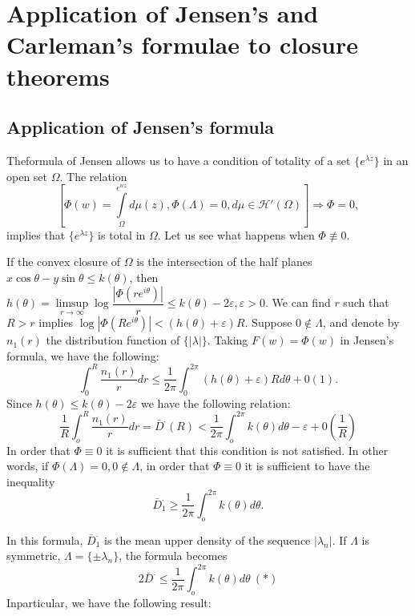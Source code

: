 \chapter[Application of Jensen's and Carleman's formulae...]{Application of Jensen's and Carleman's formulae
 to closure theorems}\label{chap11}%

\section{ Application of Jensen's formula}\label{chap11:sec1}%

The\pageoriginale formula of Jensen allows us to have a condition of totality of a
set $\{ e^{\lambda z} \}$ in an open set $\Omega$. The relation 
$$
[\Phi (w) = \int\limits^{e^{wz}}_{\Omega} d \mu (z), \Phi (\Lambda) = 0, d
 \mu \in \mathscr{H}' (\Omega)] \Rightarrow \Phi = 0, 
$$
implies that $\{ e^{\lambda z} \}$ is total in $\Omega$. Let us see
what happens when $\Phi \nequiv 0$. 

If the convex closure of $\Omega$ is the intersection of the half
planes $x \cos \theta - y \sin \theta \le k (\theta)$, then $h(\theta)
= \limsup \limits_{r \rightarrow \infty} \log \dfrac{| \Phi (re^{i
 \theta})|}{r} \le k(\theta)- 2 \varepsilon, \varepsilon > 0 $. We
can find $r$ such that $R > r$ implies $\log |\Phi (Re^{i \theta})| <
(h(\theta) + \varepsilon) R$. Suppose $0 \notin \Lambda$, and denote
by $n_1(r)$ the distribution function of $\{|\lambda| \}$. Taking
$F(w) = \Phi(w)$ in Jensen's formula, we have the following: 
$$
\int^R_0 \frac{n_1(r)}{r} dr \le \frac{1}{2 \pi} \int^{2 \pi}_{0}
(h(\theta) + \varepsilon ) R d \theta + 0(1). 
$$
Since $h(\theta) \le k (\theta) - 2 \varepsilon$ we have the following
relation: 
$$
\frac{1}{R} \int^R_o \frac{n_1 (r)}{r} dr = \bar{D}^.(R) < \frac{1}{2
 \pi} \int^{2 \pi}_{o} k(\theta)d \theta - \varepsilon +
0(\frac{1}{R}) 
$$
In order that $\Phi \equiv 0$ it is sufficient that this condition is
not satisfied. In other words, if $\Phi(\Lambda) = 0, 0 \notin
\Lambda$, in order that $\Phi \equiv 0$ it is sufficient to have the
inequality 
$$
\bar{D}^._1 \ge \frac{1}{2 \pi} \int^{2 \pi}_{o} k(\theta)d \theta.
$$

In this formula, $\bar{D}^._1$ is the mean upper density of the sequence
$|\lambda_n|$. If $\Lambda$ is symmetric, $\Lambda = \{ \pm \lambda_n
\}$, the formula becomes 
$$
2 \bar{D}^. \le \frac{1}{2 \pi} \int^{2 \pi}_{o} k(\theta) d \theta~ (*)
$$
In\pageoriginale particular, we have the following result:

